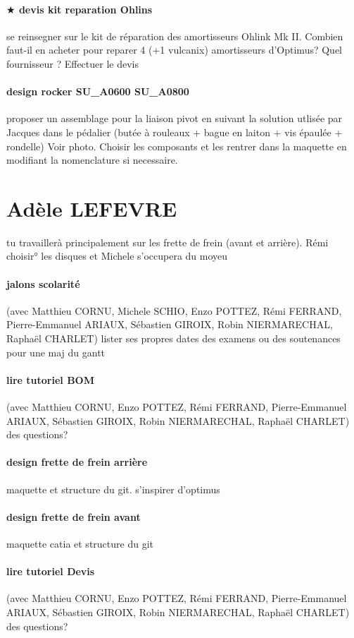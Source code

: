 \paragraph{$\bigstar$ devis kit reparation Ohlins} se reinsegner sur le kit de réparation des amortisseurs Ohlink Mk II. Combien faut-il en acheter pour reparer 4 (+1 vulcanix) amortisseurs d'Optimus? Quel fournisseur ? Effectuer le devis 
\paragraph{design rocker SU\_A0600 SU\_A0800} proposer un assemblage pour la liaison pivot en suivant la solution utlisée par Jacques dans le pédalier (butée à rouleaux + bague en laiton + vis épaulée + rondelle) Voir photo. Choisir les composants et les rentrer dans la maquette en modifiant la nomenclature si necessaire.

 
 \newpage \section*{Adèle LEFEVRE} 
 \par tu travaillerà principalement sur les frette de frein (avant et arrière). Rémi choisir° les disques et Michele s'occupera du moyeu
\paragraph{jalons scolarité} (avec Matthieu CORNU, Michele SCHIO, Enzo POTTEZ, Rémi FERRAND, Pierre-Emmanuel ARIAUX, Sébastien GIROIX, Robin NIERMARECHAL, Raphaël CHARLET) lister ses propres dates des examens ou des soutenances pour une maj du gantt
\paragraph{lire tutoriel BOM} (avec Matthieu CORNU, Enzo POTTEZ, Rémi FERRAND, Pierre-Emmanuel ARIAUX, Sébastien GIROIX, Robin NIERMARECHAL, Raphaël CHARLET) des questions?
\paragraph{design frette de frein arrière} maquette et structure du git. s'inspirer d'optimus
\paragraph{design frette de frein avant} maquette catia et structure du git
\paragraph{lire tutoriel Devis} (avec Matthieu CORNU, Enzo POTTEZ, Rémi FERRAND, Pierre-Emmanuel ARIAUX, Sébastien GIROIX, Robin NIERMARECHAL, Raphaël CHARLET) des questions?
